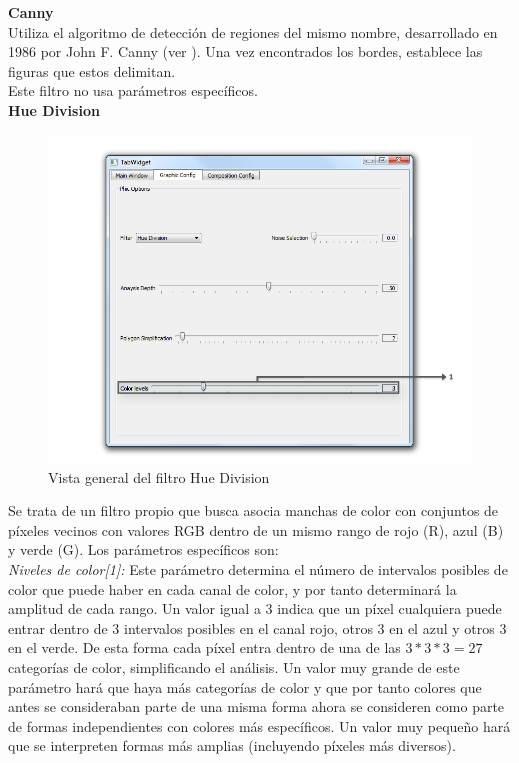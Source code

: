 	\noindent\textbf{Canny}\\

		Utiliza el algoritmo de detección de regiones del mismo nombre, desarrollado en 1986 por John F. Canny (ver \cite{opencvDoc}). Una vez encontrados los bordes, establece las figuras que estos delimitan.\\
		
		Este filtro no usa parámetros específicos.\\
		
	\noindent\textbf{Hue Division}\\

		\begin{figure}[htbp]
		\centering
		\hspace*{-0.9in}
		\includegraphics[scale=0.57]{graphics/interfazhue.png}
		\caption{Vista general del filtro Hue Division}
		\label{fig:interfazhue}
		\end{figure}

		Se trata de un filtro propio que busca asocia manchas de color con conjuntos de píxeles vecinos con valores RGB dentro de un mismo rango de rojo (R), azul (B) y verde (G). Los parámetros específicos son:\\
		
		\noindent\textit{Niveles de color[1]:} Este parámetro determina el número de intervalos posibles de color que puede haber en cada canal de color, y por tanto determinará la amplitud de cada rango. Un valor igual a 3 indica que un píxel cualquiera puede entrar dentro de 3 intervalos posibles en el canal rojo, otros 3 en el azul y otros 3 en el verde. De esta forma cada píxel entra dentro de una de las $3*3*3=27$ categorías de color, simplificando el análisis. Un valor muy grande de este parámetro hará que haya más categorías de color y que por tanto colores que antes se consideraban parte de una misma forma ahora se consideren como parte de formas independientes con colores más específicos. Un valor muy pequeño hará que se interpreten formas más amplias (incluyendo píxeles más diversos).\\
		
